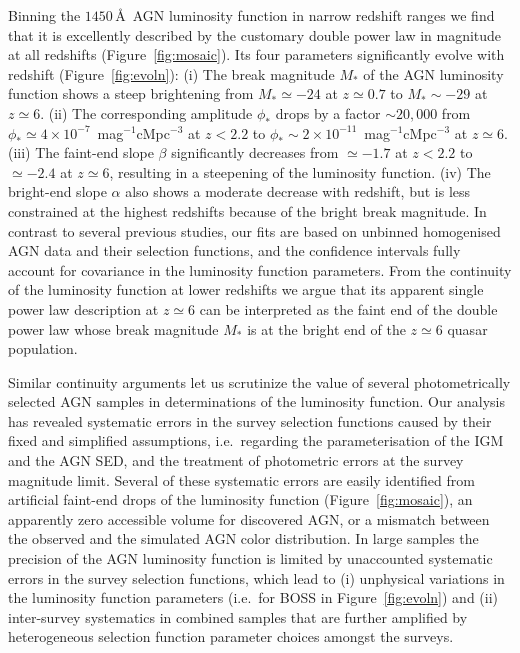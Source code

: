 \documentclass[fleqn,usenatbib]{mnras}
\begin{document}
Binning the $1450$\,\AA\ AGN luminosity function in narrow redshift ranges we find that it is
excellently described by the customary double power law in magnitude at all redshifts (Figure~\ref{fig:mosaic}).
Its four parameters significantly evolve with redshift (Figure~\ref{fig:evoln}):
(i) The break magnitude $M_*$ of the AGN luminosity function shows a steep brightening from $M_*\simeq -24$ at $z\simeq 0.7$ to $M_*\sim -29$ at $z\simeq 6$.
(ii) The corresponding amplitude $\phi_*$ drops by a factor $\sim 20,000$ from $\phi_*\simeq 4\times 10^{-7}$~mag$^{-1}$cMpc$^{-3}$ at $z<2.2$ to $\phi_*\sim 2\times 10^{-11}$~mag$^{-1}$cMpc$^{-3}$ at $z\simeq 6$.
(iii) The faint-end slope $\beta$ significantly decreases from $\simeq -1.7$ at $z<2.2$ to $\simeq -2.4$ at $z\simeq 6$, resulting in a steepening of the luminosity function.
(iv) The bright-end slope $\alpha$ also shows a moderate decrease with redshift, but is less constrained at the highest redshifts because of the bright break magnitude.
In contrast to several previous studies, our fits are based on unbinned homogenised AGN data
and their selection functions, and the confidence intervals fully account for covariance in the luminosity function parameters. 
From the continuity of the luminosity function at lower redshifts we argue that its apparent
single power law description at $z\simeq 6$ can be interpreted as the faint end of the double power law
whose break magnitude $M_*$ is at the bright end of the $z\simeq 6$ quasar population.

Similar continuity arguments let us scrutinize the value of several photometrically selected AGN samples
in determinations of the luminosity function. Our analysis has revealed systematic errors in the survey
selection functions caused by their fixed and simplified assumptions, i.e.\ regarding the parameterisation
of the IGM and the AGN SED, and the treatment of photometric errors at the survey magnitude limit.
Several of these systematic errors are easily identified from artificial faint-end drops of the luminosity function
(Figure~\ref{fig:mosaic}), an apparently zero accessible volume for discovered AGN,
or a mismatch between the observed and the simulated AGN color distribution. 
In large samples the precision of the AGN luminosity function is limited by unaccounted systematic errors
in the survey selection functions, which lead to (i) unphysical variations in the luminosity function parameters
(i.e.\ for BOSS in Figure~\ref{fig:evoln}) and (ii) inter-survey systematics in combined samples that are further
amplified by heterogeneous selection function parameter choices amongst the surveys.
\end{document}
